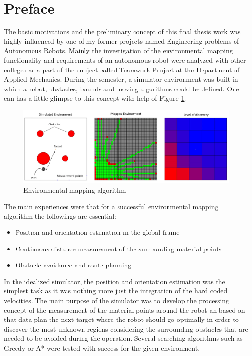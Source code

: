 \documentclass[12pt,english,twoside]{article}
\begin{document}
\section*{Preface}
The basic motivations and the preliminary concept of this final thesis work was highly influenced by one of my former projects named Engineering problems of Autonomous Robots. Mainly the investigation of the environmental mapping functionality and requirements of an autonomous robot were analyzed with other colleges as a part of the subject called Teamwork Project at the Department of Applied Mechanics. During the semester, a simulator environment was built in which a robot, obstacles, bounds and moving algorithms could be defined. One can has a little glimpse to this concept with help of Figure \ref{glimpse}.
\begin{figure}[h]
	\centering
	\includegraphics[width=\textwidth]{figures/glimpse.png}
	\caption{Environmental mapping algorithm}
	\label{glimpse}
\end{figure}

The main experiences were that for a successful environmental mapping algorithm the followings are essential:
\begin{itemize}
	\item Position and orientation estimation in the global frame
	\item Continuous distance measurement of the surrounding material points
	\item Obstacle avoidance and route planning
\end{itemize}

In the idealized simulator, the position and orientation estimation was the simplest task as it was nothing more just the integration of the hard coded velocities. The main purpose of the simulator was to develop the processing concept of the measurement of the material points around the robot an based on that data plan the next target where the robot should go optimally in order to discover the most unknown regions considering the surrounding obstacles that are needed to be avoided during the operation. Several searching algorithms such as Greedy or A* were tested with success for the given environment. 
\end{document}
